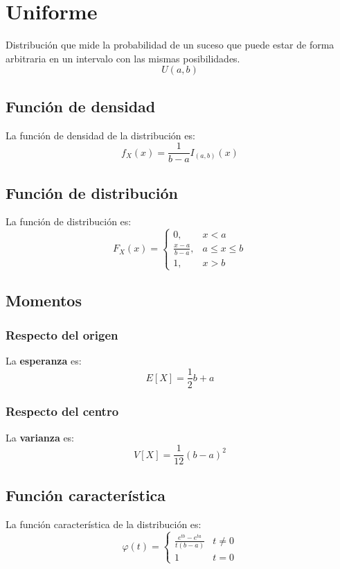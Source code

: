 \section{Uniforme}
\label{sec:uniforme}
Distribución que mide la probabilidad de un suceso que puede estar de forma arbitraria en un intervalo con las mismas posibilidades.
\[
\boxed{U\left( a, b \right)}
\]

\subsection{Función de densidad}
La función de densidad de la distribución es:
\[
f_X \left( x \right) = \frac{1}{b-a} I_{\left( a, b \right)}\left( x \right)
\]

\subsection{Función de distribución}
La función de distribución es:
\[
F_X\left( x \right) = \begin{cases}
    0, &x < a\\ 
    \frac{x-a}{b-a}, & a \le x \le b\\ 
    1, & x > b
\end{cases}
\]

\subsection{Momentos}

\subsubsection*{Respecto del origen}
La \textbf{esperanza} es: 
\[
    E\left[ X \right] = \frac{1}{2} b+a
\]
\subsubsection*{Respecto del centro}
La \textbf{varianza} es:
\[
    V\left[ X \right] = \frac{1}{12}\left( b - a \right)^2
\]

\subsection{Función característica}
La función característica de la distribución es:
\[
\varphi\left( t \right) = \begin{cases}
    \frac{e^{tb} - e^{ta}}{t\left( b - a \right)}&t \neq 0\\
    1 &t = 0
\end{cases} 
\]

